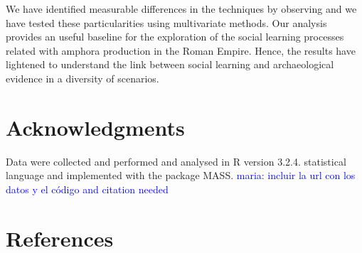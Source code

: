 \documentclass[review]{elsarticle}
\newcommand{\memo}[2]{\textcolor{#1}{#2}}
\newcommand{\maria}[1]{\memo{blue}{maria: #1\\}}
\begin{document}
We have identified measurable differences in the techniques by observing and we have tested these particularities using multivariate methods. Our analysis provides an useful baseline for the exploration of the social learning processes related with amphora production in the Roman Empire. Hence, the results have lightened to understand the link between social learning and archaeological evidence in a diversity of scenarios. 

\section{Acknowledgments}

Data were collected and performed and analysed in R version 3.2.4. statistical language and implemented with the package MASS.
\maria{incluir la url con los datos y el código and citation needed}





\section*{References}

%

\end{document}
